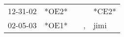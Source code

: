 \begin{supertabular}{lllll}
 12-31-02 &  *OE2* &   &    &  *CE2* \\
 02-05-03 &  *OE1* &   &  , &   jimi \\
\end{supertabular}

